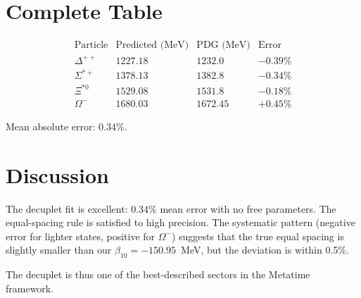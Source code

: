 \section{Complete Table}

\[
\begin{array}{lccc}
\text{Particle} & \text{Predicted (MeV)} & \text{PDG (MeV)} & \text{Error} \\
\hline
\Delta^{++} & 1227.18 & 1232.0  & -0.39\% \\
\Sigma^{*+} & 1378.13 & 1382.8  & -0.34\% \\
\Xi^{*0}    & 1529.08 & 1531.8  & -0.18\% \\
\Omega^-   & 1680.03 & 1672.45 & +0.45\%
\end{array}
\]

Mean absolute error: \(0.34\%\).

\section{Discussion}

The decuplet fit is excellent: \(0.34\%\) mean error with no free parameters.
The equal-spacing rule is satisfied to high precision.  The systematic
pattern (negative error for lighter states, positive for \(\Omega^-\))
suggests that the true equal spacing is slightly smaller than our
\(\beta_{10} = -150.95\)~MeV, but the deviation is within 0.5\%.

The decuplet is thus one of the best-described sectors in the Metatime
framework.
